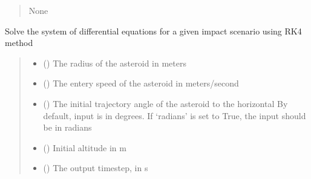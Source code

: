 \documentclass[letterpaper,10pt,english]{sphinxmanual}
\begin{document}
\begin{fulllineitems}
\begin{fulllineitems}
\begin{quote}
\begin{description}
\sphinxAtStartPar
None

\end{description}\end{quote}

\end{fulllineitems}


\begin{fulllineitems}
\label{\detokenize{index:solver.Planet.solve_atmospheric_entry_RK4}}
\pysigstartsignatures
{}
\pysigstopsignatures
\sphinxAtStartPar
Solve the system of differential equations for a given impact scenario
using RK4 method
\begin{quote}\begin{description}
\begin{itemize}
\item {} 
\sphinxAtStartPar
{} () \textendash{} The radius of the asteroid in meters

\item {} 
\sphinxAtStartPar
{} () \textendash{} The entery speed of the asteroid in meters/second

\item {} 
\sphinxAtStartPar
{} () \textendash{} The initial trajectory angle of the asteroid to the horizontal
By default, input is in degrees. If ‘radians’ is set to True, the
input should be in radians

\item {} 
\sphinxAtStartPar
{} (\sphinxstyleliteralemphasis{\sphinxupquote{, }}) \textendash{} Initial altitude in m

\item {} 
\sphinxAtStartPar
{} (\sphinxstyleliteralemphasis{\sphinxupquote{, }}) \textendash{} The output timestep, in s


\end{itemize}
\end{description}
\end{quote}
\end{fulllineitems}
\end{fulllineitems}
\end{document}
